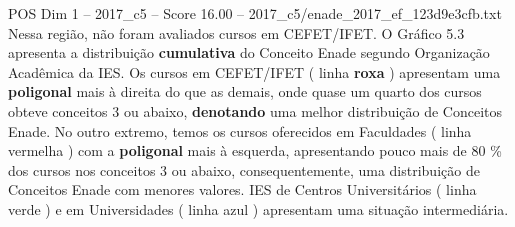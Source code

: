 \begin{textsample}{POS Dim 1 – 2017\_c5 – Score 16.00 – 2017\_c5/enade\_2017\_ef\_123d9e3cfb.txt}
Nessa região, não foram avaliados cursos em CEFET/IFET.
O Gráfico 5.3 apresenta a distribuição \textbf{cumulativa} do Conceito Enade segundo Organização Acadêmica da IES.
Os cursos em CEFET/IFET ( linha \textbf{roxa} ) apresentam uma \textbf{poligonal} mais à direita do que as demais, onde quase um quarto dos cursos obteve conceitos 3 ou abaixo, \textbf{denotando} uma melhor distribuição de Conceitos Enade.
No outro extremo, temos os cursos oferecidos em Faculdades ( linha vermelha ) com a \textbf{poligonal} mais à esquerda, apresentando pouco mais de 80 \% dos cursos nos conceitos 3 ou abaixo, consequentemente, uma distribuição de Conceitos Enade com menores valores.
IES de Centros Universitários ( linha verde ) e em Universidades ( linha azul ) apresentam uma situação intermediária.

\end{textsample}
